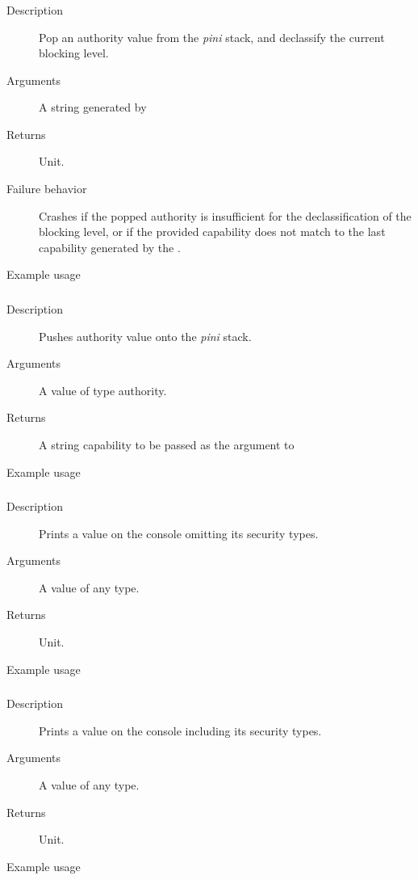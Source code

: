 \subsubsection{}
\begin{description}
    \item [Description] Pop an authority value from the \emph{pini} stack, and declassify the current blocking level.
    \item [Arguments] A string generated by 
    \item [Returns] Unit.
    \item [Failure behavior] Crashes if the popped authority is insufficient for the declassification of the blocking level,
or if the provided capability does not match to the last capability generated by the .
    \item [Example usage] 
\end{description}

\subsubsection{}
\begin{description}
    \item [Description] Pushes authority value onto the \emph{pini} stack.
    \item [Arguments] A value of type authority.
    \item [Returns] A string capability to be passed as the argument to 
    \item [Example usage] 
\end{description}

\subsubsection{}
\begin{description}
    \item [Description] Prints a value on the console omitting its security types.
    \item [Arguments] A value of any type.
    \item [Returns] Unit.
    \item [Example usage] 
\end{description}


\subsubsection{}
\begin{description}
    \item [Description] Prints a value on the console including its security types.
    \item [Arguments] A value of any type.
    \item [Returns] Unit.
    \item [Example usage] 
\end{description}

